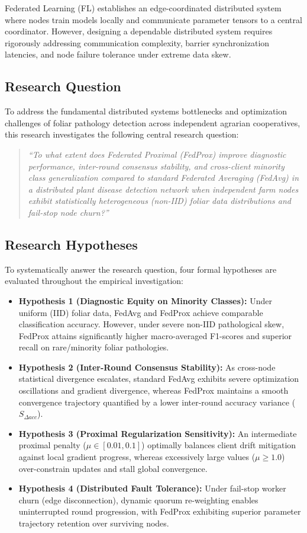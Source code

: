 \documentclass[applsci,article,submit,oneauthor,pdftex]{Definitions/mdpi}
\begin{document}
Federated Learning (FL) establishes an edge-coordinated distributed system where nodes train models locally and communicate parameter tensors to a central coordinator. However, designing a dependable distributed system requires rigorously addressing communication complexity, barrier synchronization latencies, and node failure tolerance under extreme data skew.

\subsection{Research Question}
To address the fundamental distributed systems bottlenecks and optimization challenges of foliar pathology detection across independent agrarian cooperatives, this research investigates the following central research question:
\begin{quote}
\textit{``To what extent does Federated Proximal (FedProx) improve diagnostic performance, inter-round consensus stability, and cross-client minority class generalization compared to standard Federated Averaging (FedAvg) in a distributed plant disease detection network when independent farm nodes exhibit statistically heterogeneous (non-IID) foliar data distributions and fail-stop node churn?''}
\end{quote}

\subsection{Research Hypotheses}
To systematically answer the research question, four formal hypotheses are evaluated throughout the empirical investigation:
\begin{itemize}[leftmargin=*]
    \item \textbf{Hypothesis 1 (Diagnostic Equity on Minority Classes):} Under uniform (IID) foliar data, FedAvg and FedProx achieve comparable classification accuracy. However, under severe non-IID pathological skew, FedProx attains significantly higher macro-averaged F1-scores and superior recall on rare/minority foliar pathologies.
    \item \textbf{Hypothesis 2 (Inter-Round Consensus Stability):} As cross-node statistical divergence escalates, standard FedAvg exhibits severe optimization oscillations and gradient divergence, whereas FedProx maintains a smooth convergence trajectory quantified by a lower inter-round accuracy variance ($S_{\Delta acc}$).
    \item \textbf{Hypothesis 3 (Proximal Regularization Sensitivity):} An intermediate proximal penalty ($\mu \in [0.01, 0.1]$) optimally balances client drift mitigation against local gradient progress, whereas excessively large values ($\mu \ge 1.0$) over-constrain updates and stall global convergence.
    \item \textbf{Hypothesis 4 (Distributed Fault Tolerance):} Under fail-stop worker churn (edge disconnection), dynamic quorum re-weighting enables uninterrupted round progression, with FedProx exhibiting superior parameter trajectory retention over surviving nodes.
\end{itemize}
\end{document}
